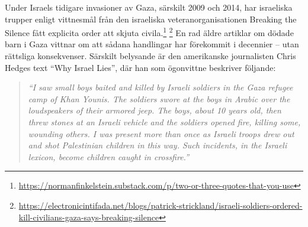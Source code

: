 Under Israels tidigare invasioner av Gaza, särskilt 2009 och 2014, har israeliska trupper enligt
vittnesmål från den israeliska veteranorganisationen Breaking the Silence fått explicita order att
skjuta civila.\footnote{\url{https://normanfinkelstein.substack.com/p/two-or-three-quotes-that-you-use}}%
\footnote{\url{https://electronicintifada.net/blogs/patrick-strickland/israeli-soldiers-ordered-kill-civilians-gaza-says-breaking-silence}} 
En rad äldre artiklar om dödade barn i Gaza vittnar om att sådana handlingar har förekommit i
decennier – utan rättsliga konsekvenser. Särskilt belysande är den amerikanske journalisten
Chris Hedges text \enquote{Why Israel Lies}, där han som ögonvittne beskriver följande:

\begin{quote}
    \textit{\enquote{I saw small boys baited and killed by Israeli soldiers in the Gaza refugee
    camp of Khan Younis. The soldiers swore at the boys in Arabic over the loudspeakers of
    their armored jeep. The boys, about 10 years old, then threw stones at an Israeli vehicle
    and the soldiers opened fire, killing some, wounding others. I was present more than once
    as Israeli troops drew out and shot Palestinian children in this way. Such incidents, in
    the Israeli lexicon, become children caught in crossfire.}}
\end{quote}


